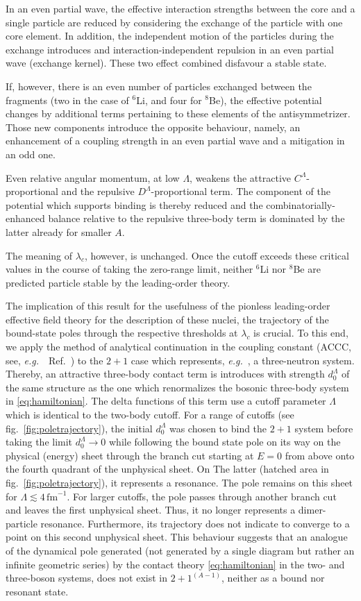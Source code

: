 \documentclass[preprint,12pt]{elsarticle}
\newcommand{\lc}{\ensuremath{\lambda_c}}
\newcommand{\fm}{\ensuremath{\,\text{fm}^{-1}}}
\newcommand{\abb}{\ensuremath{2\!+\!1^{(A-1)}}}
\newcommand{\lec}{C^\Lambda}
\newcommand{\led}{D^\Lambda}
\newcommand{\eg}{\textit{e.g.}~}
\newcommand{\figref}[1]{fig.~\ref{#1}}
\begin{document}
In an even partial wave, the effective interaction strengths between the core and a single particle are reduced
by considering the exchange of the particle with one core element. In addition, the independent motion of the particles
during the exchange introduces and interaction-independent repulsion in an even partial wave (exchange kernel).
These two effect combined disfavour a stable state.

If, however, there is an even number of particles exchanged between the fragments (two in the case of $^6$Li, and
four for $^8$Be), the effective potential changes by additional terms pertaining to these elements of the
antisymmetrizer. Those new components introduce the opposite behaviour, namely, an enhancement of a coupling strength
in an even partial wave and a mitigation in an odd one.

Even relative angular momentum, at low $\Lambda$, weakens the attractive $\lec$-proportional
and the repulsive $\led$-proportional term.
The component of the potential which supports binding is thereby reduced and the combinatorially-enhanced
balance relative to the repulsive three-body term is dominated by the latter already for smaller $A$.

The meaning of $\lc$, however, is unchanged.
Once the cutoff exceeds these critical values in the course of taking the
zero-range limit, neither $^6$Li nor $^8$Be are predicted particle stable
by the leading-order theory.

The implication of this result for the usefulness of the pionless leading-order effective field theory for
the description of these nuclei, the trajectory of the bound-state poles through the respective thresholds at $\lc$
is crucial.
To this end, we apply the method of analytical continuation in the coupling
constant (ACCC, see, \eg~Ref.~\cite{Kukulin_1977}) to the $2+1$ case which represents, \eg, a three-neutron system.
Thereby, an attractive three-body contact term is introduces with strength $d_0^\Lambda$ of the same structure as the one
which renormalizes the bosonic three-body system in \eqref{eq:hamiltonian}. The delta functions of this term use a
cutoff parameter $\Lambda$ which is identical to the two-body cutoff. For a range of cutoffs
(see \figref{fig:poletrajectory}), the initial $d_0^\Lambda$ was chosen to bind the $2+1$ system before taking
the limit $d_0^\Lambda\to 0$ while following the bound state pole on its way on the physical (energy) sheet through
the branch cut starting at $E=0$ from above onto the fourth quadrant of the unphysical sheet. On The latter (hatched
area in \figref{fig:poletrajectory}), it represents a resonance. The pole remains on this sheet for
$\Lambda\lesssim4\fm$. For larger cutoffs, the pole passes through another branch cut and leaves the first
unphysical sheet. Thus, it no longer represents a dimer-particle resonance. Furthermore, its trajectory does not
indicate to converge to a point on this second unphysical sheet. This behaviour suggests that an analogue of the dynamical
pole generated (not generated by a single diagram but rather an infinite geometric series) by the
contact theory \eqref{eq:hamiltonian} in the two- and three-boson systems, does not
exist in \abb, neither as a bound nor resonant state.
\end{document}
